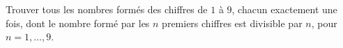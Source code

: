 Trouver tous les nombres formés des chiffres de $1$ à $9$, chacun exactement une fois, dont le nombre formé par les $n$ premiers chiffres est divisible par $n$, pour $n = 1, \ldots, 9$.
